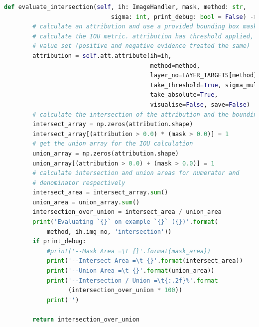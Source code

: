 \documentclass[main]{subfiles}
\begin{document}
\begin{lstlisting}[language=Python,basicstyle=\scriptsize]
    def evaluate_intersection(self, ih: ImageHandler, mask, method: str, 
                              sigma: int, print_debug: bool = False) -> float:
        # calculate an attribution and use a provided bounding box mask to 
        # calculate the IOU metric. attribution has threshold applied, and abs 
        # value set (positive and negative evidence treated the same)
        attribution = self.att.attribute(ih=ih,
                                         method=method,
                                         layer_no=LAYER_TARGETS[method][self.model_name],
                                         take_threshold=True, sigma_multiple=sigma, 
                                         take_absolute=True,
                                         visualise=False, save=False)
        # calculate the intersection of the attribution and the bounding box mask
        intersect_array = np.zeros(attribution.shape)
        intersect_array[(attribution > 0.0) * (mask > 0.0)] = 1
        # get the union array for the IOU calculation
        union_array = np.zeros(attribution.shape)
        union_array[(attribution > 0.0) + (mask > 0.0)] = 1
        # calculate intersection and union areas for numerator and 
        # denominator respectively
        intersect_area = intersect_array.sum()
        union_area = union_array.sum()
        intersection_over_union = intersect_area / union_area
        print('Evaluating `{}` on example `{}` ({})'.format(
            method, ih.img_no, 'intersection'))
        if print_debug:
            #print('--Mask Area =\t {}'.format(mask_area))
            print('--Intersect Area =\t {}'.format(intersect_area))
            print('--Union Area =\t {}'.format(union_area))
            print('--Intersection / Union =\t{:.2f}%'.format
                  (intersection_over_union * 100))
            print('')

        return intersection_over_union


\end{lstlisting}
\end{document}
